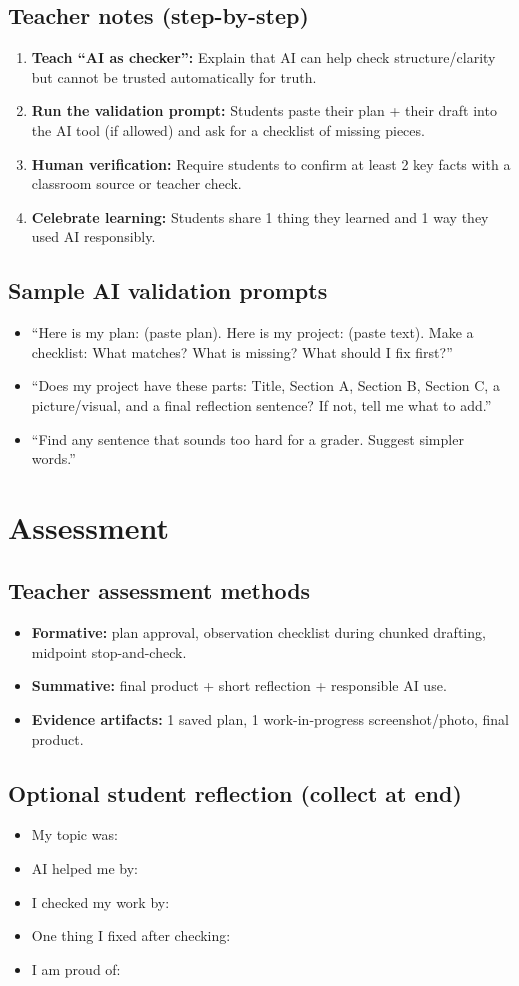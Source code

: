 \documentclass[11pt]{article}
\newcommand{\Session}[1]{\section*{#1}}
\newcommand{\Sub}[1]{\subsection*{#1}}
\begin{document}
\Sub{Teacher notes (step-by-step)}
\begin{enumerate}[leftmargin=*]
  \item \textbf{Teach ``AI as checker'':}
  Explain that AI can help check structure/clarity but cannot be trusted automatically for truth.
  \item \textbf{Run the validation prompt:}
  Students paste their plan + their draft into the AI tool (if allowed) and ask for a checklist of missing pieces.
  \item \textbf{Human verification:}
  Require students to confirm at least 2 key facts with a classroom source or teacher check.
  \item \textbf{Celebrate learning:}
  Students share 1 thing they learned and 1 way they used AI responsibly.
\end{enumerate}

\Sub{Sample AI validation prompts}
\begin{itemize}[leftmargin=*]
  \item ``Here is my plan: (paste plan). Here is my project: (paste text). Make a checklist: What matches? What is missing? What should I fix first?''
  \item ``Does my project have these parts: Title, Section A, Section B, Section C, a picture/visual, and a final reflection sentence? If not, tell me what to add.''
  \item ``Find any sentence that sounds too hard for a \underline{\hspace{1cm}} grader. Suggest simpler words.''
\end{itemize}

\Session{Assessment}
\Sub{Teacher assessment methods}
\begin{itemize}[leftmargin=*]
  \item \textbf{Formative:} plan approval, observation checklist during chunked drafting, midpoint stop-and-check.
  \item \textbf{Summative:} final product + short reflection + responsible AI use.
  \item \textbf{Evidence artifacts:} 1 saved plan, 1 work-in-progress screenshot/photo, final product.
\end{itemize}

\Sub{Optional student reflection (collect at end)}
\begin{itemize}[leftmargin=*]
  \item My topic was: \underline{\hspace{10cm}}
  \item AI helped me by: \underline{\hspace{10cm}}
  \item I checked my work by: \underline{\hspace{10cm}}
  \item One thing I fixed after checking: \underline{\hspace{10cm}}
  \item I am proud of: \underline{\hspace{10cm}}
\end{itemize}
\end{document}
